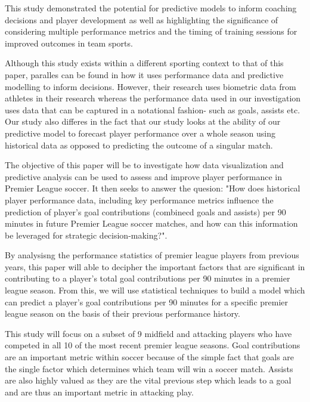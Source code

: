 \documentclass[12pt]{article}
\begin{document}
This study demonstrated the potential for predictive models to inform coaching
decisions and player development as well as highlighting the significance of
considering multiple performance metrics and the timing of training sessions for
improved outcomes in team sports.

Although this study exists within a different sporting context to that of this 
paper, paralles can be found in how it uses performance data and predictive
modelling to inform decisions. However, their research uses biometric data from 
athletes in their research whereas the performance data used in our investigation
uses data that can be captured in a notational fashion- such as goals, assists 
etc. Our study also differes in the fact that our study looks at the ability
of our predictive model to forecast player performance over a whole season using
historical data as opposed to predicting the outcome of a singular match.







The objective of this paper will be to investigate how data visualization and
predictive analysis can be used to assess and improve player performance in
Premier League soccer. It then seeks to answer the quesion:
"How does historical player performance data, including key performance
metrics influence the prediction of player's goal contributions
(combinecd goals and assists) per 90 minutes in future Premier League 
soccer matches, and how can this information be leveraged for strategic 
decision-making?".

By analysisng the performance statistics of premier league 
players from previous years, this paper will able to decipher the important
factors that are significant in contributing to a player's total goal
contributions per 90 minutes in a premier league season. From this, we will use 
statistical techniques to build a model which can predict a player's goal 
contributions per 90 minutes for a specific premier league season on the basis
of their previous performance history. 

This study will focus on a subset of 9 
midfield and attacking players who have competed in all 10 of the most recent 
premier league seasons. Goal contributions are an important metric within soccer
because of the simple fact that goals are the single factor which determines
which team will win a soccer match. Assists are also highly valued as they are
the vital previous step which leads to a goal and are thus an important metric
in attacking play.
\end{document}
